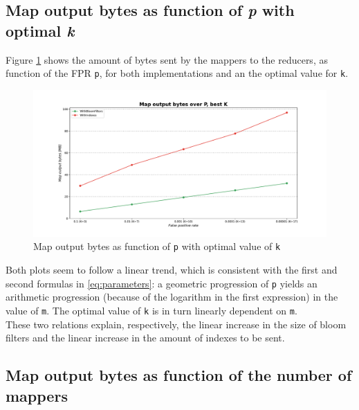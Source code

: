 \subsection*{Map output bytes as function of \textit{p} with optimal \textit{k}}

Figure \ref{fig:MapOutputBytesP_bestK} shows the amount of bytes sent by the mappers to the reducers, as function of the FPR \texttt{p}, for both implementations and an the optimal value for \texttt{k}.\\

\begin{figure}[H]
    \begin{center}
        \includegraphics[scale=.45,trim={3cm 0 3cm 0},clip]{img/MapOutputBytesP_bestK.pdf}
    \end{center}
    \vspace*{-0.5cm}
    \caption{Map output bytes as function of \texttt{p} with optimal value of \texttt{k}}
    \label{fig:MapOutputBytesP_bestK}
\end{figure}


\noindent Both plots seem to follow a linear trend, which is consistent with the first and second formulas in \ref{eq:parameters}: a geometric progression of \texttt{p} yields an arithmetic progression (because of the logarithm in the first expression) in the value of \texttt{m}. The optimal value of \texttt{k} is in turn linearly dependent on \texttt{m}.\\
These two relations explain, respectively, the linear increase in the size of bloom filters and the linear increase in the amount of indexes to be sent.

\subsection*{Map output bytes as function of the number of mappers}

